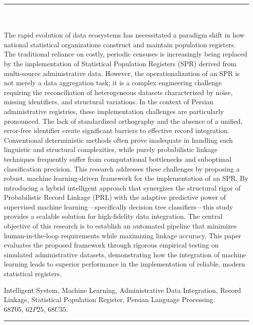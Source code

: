 \documentclass[twoside]{article}
\begin{document}
\rule{\textwidth}{0.2mm}\\
\\
The rapid evolution of data ecosystems has necessitated a paradigm shift in how national statistical organizations construct and maintain population registers. The traditional reliance on costly, periodic censuses is increasingly being replaced by the implementation of Statistical Population Registers (SPR) derived from multi-source administrative data. However, the operationalization of an SPR is not merely a data aggregation task; it is a complex engineering challenge requiring the reconciliation of heterogeneous datasets characterized by noise, missing identifiers, and structural variations.
In the context of Persian administrative registries, these implementation challenges are particularly pronounced. The lack of standardized orthography and the absence of a unified, error-free identifier create significant barriers to effective record integration. Conventional deterministic methods often prove inadequate in handling such linguistic and structural complexities, while purely probabilistic linkage techniques frequently suffer from computational bottlenecks and suboptimal classification precision.
This research addresses these challenges by proposing a robust, machine learning-driven framework for the implementation of an SPR. By introducing a hybrid intelligent approach that synergizes the structural rigor of Probabilistic Record Linkage (PRL) with the adaptive predictive power of supervised machine learning—specifically decision tree classifiers—this study provides a scalable solution for high-fidelity data integration. The central objective of this research is to establish an automated pipeline that minimizes human-in-the-loop requirements while maximizing linkage accuracy. This paper evaluates the proposed framework through rigorous empirical testing on simulated administrative datasets, demonstrating how the integration of machine learning leads to superior performance in the implementation of reliable, modern statistical registers.

Intelligent System, Machine Learning, Administrative Data Integration, Record Linkage, Statistical Population Register, Persian Language Processing. \\
 $68T05$, $62P25$, $68U35$. \\
\hspace{1cm}\rule{\textwidth}{0.2mm}\\
\end{document}
